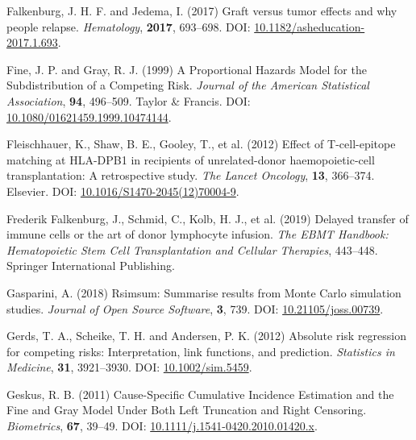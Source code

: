 \documentclass[
  letterpaper,
  paper=240mm:170mm,
  twoside=true,
  open=right,
  fontsize=10pt,
  pagesize=false,
  BCOR=15mm,
  DIV=14,
  headinclude=true,
  footinclude=false,
  headsepline=on]{scrbook}
\newlength{\cslhangindent}
\newenvironment{CSLReferences}[2] %
 {\begin{list}{}{%
  \setlength{\itemindent}{0pt}
  \setlength{\leftmargin}{0pt}
  \setlength{\parsep}{0pt}
  \ifodd #1
   \setlength{\leftmargin}{\cslhangindent}
   \setlength{\itemindent}{-1\cslhangindent}
  \fi
  \setlength{\itemsep}{#2\baselineskip}}}
 {\end{list}}
\begin{document}
\begin{CSLReferences}{1}{1}
Falkenburg, J. H. F. and Jedema, I. (2017) Graft versus tumor effects
and why people relapse. \emph{Hematology}, \textbf{2017}, 693--698. DOI:
\href{https://doi.org/10.1182/asheducation-2017.1.693}{10.1182/asheducation-2017.1.693}.

Fine, J. P. and Gray, R. J. (1999) A {Proportional Hazards Model} for
the {Subdistribution} of a {Competing Risk}. \emph{Journal of the
American Statistical Association}, \textbf{94}, 496--509. Taylor \&
Francis. DOI:
\href{https://doi.org/10.1080/01621459.1999.10474144}{10.1080/01621459.1999.10474144}.

Fleischhauer, K., Shaw, B. E., Gooley, T., et al. (2012) Effect of
{T-cell-epitope} matching at {HLA-DPB1} in recipients of unrelated-donor
haemopoietic-cell transplantation: A retrospective study. \emph{The
Lancet Oncology}, \textbf{13}, 366--374. Elsevier. DOI:
\href{https://doi.org/10.1016/S1470-2045(12)70004-9}{10.1016/S1470-2045(12)70004-9}.

Frederik Falkenburg, J., Schmid, C., Kolb, H. J., et al. (2019) Delayed
transfer of immune cells or the art of donor lymphocyte infusion.
\emph{The EBMT Handbook: Hematopoietic Stem Cell Transplantation and
Cellular Therapies}, 443--448. Springer International Publishing.

Gasparini, A. (2018) Rsimsum: {Summarise} results from {Monte Carlo}
simulation studies. \emph{Journal of Open Source Software}, \textbf{3},
739. DOI:
\href{https://doi.org/10.21105/joss.00739}{10.21105/joss.00739}.

Gerds, T. A., Scheike, T. H. and Andersen, P. K. (2012) Absolute risk
regression for competing risks: Interpretation, link functions, and
prediction. \emph{Statistics in Medicine}, \textbf{31}, 3921--3930. DOI:
\href{https://doi.org/10.1002/sim.5459}{10.1002/sim.5459}.

Geskus, R. B. (2011) Cause-{Specific Cumulative Incidence Estimation}
and the {Fine} and {Gray Model Under Both Left Truncation} and {Right
Censoring}. \emph{Biometrics}, \textbf{67}, 39--49. DOI:
\href{https://doi.org/10.1111/j.1541-0420.2010.01420.x}{10.1111/j.1541-0420.2010.01420.x}.


\end{CSLReferences}
\end{document}
